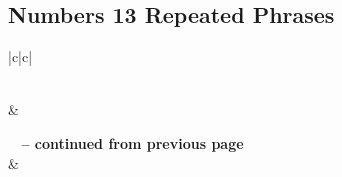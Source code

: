 \subsection{Numbers 13 Repeated Phrases}


\normalsize
 
\begin{center}
\begin{longtable}{|c|c|}
\caption[Numbers 13 Repeated Phrases]{Numbers 13 Repeated Phrases}\label{table:Repeated Phrases Numbers 13} \\
\hline {} &  \\ \hline 
\endfirsthead
 
{{\bfseries \tablename\ \thetable{} -- continued from previous page}} \\  
\hline {} &  \\ \hline 
\endhead
 

\end{longtable}
\end{center}
